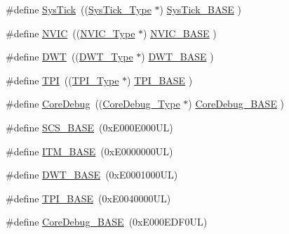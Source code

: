 \begin{DoxyCompactItemize}
\item 
\#define \mbox{\hyperlink{group___c_m_s_i_s__core__base_gacd96c53beeaff8f603fcda425eb295de}{Sys\+Tick}}~((\mbox{\hyperlink{struct_sys_tick___type}{Sys\+Tick\+\_\+\+Type}}   $\ast$)     \mbox{\hyperlink{group___c_m_s_i_s__core__base_ga58effaac0b93006b756d33209e814646}{Sys\+Tick\+\_\+\+B\+A\+SE}}     )
\item 
\#define \mbox{\hyperlink{group___c_m_s_i_s__core__base_gac8e97e8ce56ae9f57da1363a937f8a17}{N\+V\+IC}}~((\mbox{\hyperlink{struct_n_v_i_c___type}{N\+V\+I\+C\+\_\+\+Type}}      $\ast$)     \mbox{\hyperlink{group___c_m_s_i_s__core__base_gaa0288691785a5f868238e0468b39523d}{N\+V\+I\+C\+\_\+\+B\+A\+SE}}        )
\item 
\#define \mbox{\hyperlink{group___c_m_s_i_s__core__base_gabbe5a060185e1d5afa3f85b14e10a6ce}{D\+WT}}~((\mbox{\hyperlink{struct_d_w_t___type}{D\+W\+T\+\_\+\+Type}}       $\ast$)     \mbox{\hyperlink{group___c_m_s_i_s__core__base_gafdab534f961bf8935eb456cb7700dcd2}{D\+W\+T\+\_\+\+B\+A\+SE}}         )
\item 
\#define \mbox{\hyperlink{group___c_m_s_i_s__core__base_ga8b4dd00016aed25a0ea54e9a9acd1239}{T\+PI}}~((\mbox{\hyperlink{struct_t_p_i___type}{T\+P\+I\+\_\+\+Type}}       $\ast$)     \mbox{\hyperlink{group___c_m_s_i_s__core__base_ga2b1eeff850a7e418844ca847145a1a68}{T\+P\+I\+\_\+\+B\+A\+SE}}         )
\item 
\#define \mbox{\hyperlink{group___c_m_s_i_s__core__base_gab6e30a2b802d9021619dbb0be7f5d63d}{Core\+Debug}}~((\mbox{\hyperlink{struct_core_debug___type}{Core\+Debug\+\_\+\+Type}} $\ast$)     \mbox{\hyperlink{group___c_m_s_i_s__core__base_ga680604dbcda9e9b31a1639fcffe5230b}{Core\+Debug\+\_\+\+B\+A\+SE}}   )
\item 
\#define \mbox{\hyperlink{group___c_m_s_i_s__core__base_ga3c14ed93192c8d9143322bbf77ebf770}{S\+C\+S\+\_\+\+B\+A\+SE}}~(0x\+E000\+E000\+U\+L)
\item 
\#define \mbox{\hyperlink{group___c_m_s_i_s__core__base_gadd76251e412a195ec0a8f47227a8359e}{I\+T\+M\+\_\+\+B\+A\+SE}}~(0x\+E0000000\+U\+L)
\item 
\#define \mbox{\hyperlink{group___c_m_s_i_s__core__base_gafdab534f961bf8935eb456cb7700dcd2}{D\+W\+T\+\_\+\+B\+A\+SE}}~(0x\+E0001000\+U\+L)
\item 
\#define \mbox{\hyperlink{group___c_m_s_i_s__core__base_ga2b1eeff850a7e418844ca847145a1a68}{T\+P\+I\+\_\+\+B\+A\+SE}}~(0x\+E0040000\+U\+L)
\item 
\#define \mbox{\hyperlink{group___c_m_s_i_s__core__base_ga680604dbcda9e9b31a1639fcffe5230b}{Core\+Debug\+\_\+\+B\+A\+SE}}~(0x\+E000\+E\+D\+F0\+U\+L)

\end{DoxyCompactItemize}

